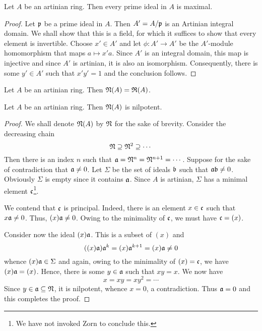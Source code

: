 \begin{proposition}
    Let $A$ be an artinian ring. Then every prime ideal in $A$ is maximal.
\end{proposition}
\begin{proof}
    Let $\mathfrak p$ be a prime ideal in $A$. Then $A' = A/\mathfrak p$ is an Artinian integral domain. We shall show that this is a field, for which it suffices to show that every element is invertible. Choose $x'\in A'$ and let $\phi: A'\to A'$ be the $A'$-module homomorphism that maps $a\mapsto x'a$. Since $A'$ is an integral domain, this map is injective and since $A'$ is artinian, it is also an isomorphism. Consequently, there is some $y'\in A'$ such that $x'y' = 1$ and the conclusion follows.
\end{proof}

\begin{corollary}
    Let $A$ be an artinian ring. Then $\mathfrak N(A) = \mathfrak R(A)$.
\end{corollary}

\begin{lemma}
    Let $A$ be an artinian ring. Then $\mathfrak N(A)$ is nilpotent.
\end{lemma}
\begin{proof}
    We shall denote $\mathfrak N(A)$ by $\mathfrak N$ for the sake of brevity. Consider the decreasing chain 
    \begin{equation*}
        \mathfrak N\supseteq\mathfrak N^2\supseteq\cdots
    \end{equation*}
    Then there is an index $n$ such that $\mathfrak a = \mathfrak N^n = \mathfrak N^{n + 1} = \cdots$. Suppose for the sake of contradiction that $\mathfrak a\ne 0$. Let $\Sigma$ be the set of ideals $\mathfrak b$ such that $\mathfrak a\mathfrak b\ne 0$. Obviously $\Sigma$ is empty since it contains $\mathfrak a$. Since $A$ is artinian, $\Sigma$ has a minimal element $\mathfrak c$\footnote{We have not invoked Zorn to conclude this.}. 

    We contend that $\mathfrak c$ is principal. Indeed, there is an element $x\in\mathfrak c$ such that $x\mathfrak a\ne 0$. Thus, $(x)\mathfrak a\ne 0$. Owing to the minimality of $\mathfrak c$, we must have $\mathfrak c = (x)$. 

    Consider now the ideal $(x)\mathfrak a$. This is a subset of $(x)$ and 
    \begin{equation*}
        ((x)\mathfrak a)\mathfrak a^k = (x)\mathfrak a^{k + 1} = (x)\mathfrak a\ne0
    \end{equation*}
    whence $(x)\mathfrak a\in\Sigma$ and again, owing to the minimality of $(x) = \mathfrak c$, we have $(x)\mathfrak a = (x)$. Hence, there is some $y\in\mathfrak a$ such that $xy = x$. We now have 
    \begin{equation*}
        x = xy = xy^2 = \cdots
    \end{equation*}
    Since $y\in\mathfrak a\subseteq\mathfrak N$, it is nilpotent, whence $x = 0$, a contradiction. Thus $\mathfrak a = 0$ and this completes the proof.
\end{proof}

